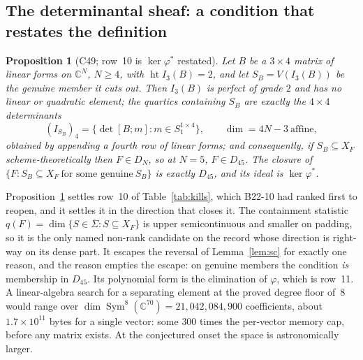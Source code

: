 \documentclass[11pt]{amsart}
\theoremstyle{plain}
\newtheorem{proposition}[theorem]{Proposition}
\theoremstyle{definition}
\theoremstyle{remark}
\DeclareMathOperator{\Sym}{Sym}
\newcommand{\bC}{\mathbb{C}}
\newcommand{\Dff}{D_{45}}
\newcommand{\Pf}{P_{5}}
\newcommand{\prov}[3]{\par\smallskip\noindent{\footnotesize\textsf{[\,label: #1\ \textbar\ source: #2\ \textbar\ lineage: #3\,]}}\par\smallskip}
\newcommand{\lit}[2]{\cite{#1}\,{\footnotesize\textsf{[#2]}}}
\newcommand{\cid}[1]{\textsf{#1}}
\newcommand{\cm}[1]{\texttt{#1}}
\begin{document}
\subsection{The determinantal sheaf: a condition that restates the definition}
\begin{proposition}[\cid{C49}; row~10 is $\ker\varphi^*$ restated]\label{prop:bordiga}
Let $B$ be a $3\times4$ matrix of linear forms on $\bC^N$, $N\ge4$, with
$\operatorname{ht}I_3(B)=2$, and let $S_B=V(I_3(B))$ be the \emph{genuine member} it cuts out.
Then $I_3(B)$ is perfect of grade $2$ and has no linear or quadratic element; the quartics
containing $S_B$ are exactly the $4\times4$ determinants
\[
(I_{S_B})_4=\{\det[B;m]: m\in S_1^{1\times4}\},\qquad \dim=4N-3\ \text{affine},
\]
obtained by appending a fourth row of linear forms; and consequently, if $S_B\subseteq X_F$
scheme-theoretically then $F\in D_N$, so at $N=5$, $F\in\Dff$. The closure of
$\{F: S_B\subseteq X_F\ \text{for some genuine}\ S_B\}$ is exactly $\Dff$, and its ideal is
$\ker\varphi^*$.
\end{proposition}
\prov{PROVED, on Hilbert--Burch in the Eagon--Northcott form and $\operatorname{grade}=\operatorname{height}$ (both \lit{BH}{UNREAD-CLASSICAL}). Part~(c) requires \emph{scheme-theoretic} containment: B23-02 exhibits a genuine member that is non-reduced (the triple structure on a plane), and under a \emph{set-theoretic} reading the condition holds on all of $\Pf$, which closes row~10 directly instead (corrigendum K6)}{B23-02 Prop.~1.1, L1--L5, L8 @ \cm{68866e6d}}{producer B23-02; reviewer B23-10 \S5.4 (READ + INDEPENDENT hand; supplied the set-theoretic reading and required the word ``scheme-theoretically'' in L5)}

\noindent Proposition~\ref{prop:bordiga} settles row~10 of Table~\ref{tab:kills}, which B22-10
had ranked first to reopen, and it settles it in the direction that closes it. The containment
statistic $q(F)=\dim\{S\in\overline{\Sigma}: S\subseteq X_F\}$ is upper semicontinuous and
smaller on padding, so it is the only named non-rank candidate on the record whose direction is
right-way on its dense part. It escapes the reversal of Lemma~\ref{lem:sc} for exactly one
reason, and the reason empties the escape: on genuine members the condition \emph{is} membership
in $\Dff$. Its polynomial form is the elimination of $\varphi$, which is row~11. A linear-algebra
search for a separating element at the proved degree floor of~$8$ would range over
$\dim\Sym^8(\bC^{70})=21{,}042{,}084{,}900$ coefficients, about $1.7\times10^{11}$ bytes for a
single vector: some $300$ times the per-vector memory cap, before any matrix exists. At the
conjectured onset the space is astronomically larger.
\prov{PROVED-merge into row~11 for sub-candidates 10a (Bordiga-type containment), 10b (rank-one ACM/Ulrich sheaf) and 10d (rational parametrisation by $4\times4$ minors); PROVED-kill at $N=5$ for 10c (non-Cartier Weil divisor), ASSESSED at $N=6,7,8$; the $\overline{\Sigma}$-elimination route ASSESSED and PRICED infeasible}{B23-02 \S1.3--\S1.6, L8--L10 @ \cm{68866e6d}}{producer B23-02; reviewer B23-10 \S5.4 and ruling B23-10.24 (READ + INDEPENDENT hand)}
\end{document}
